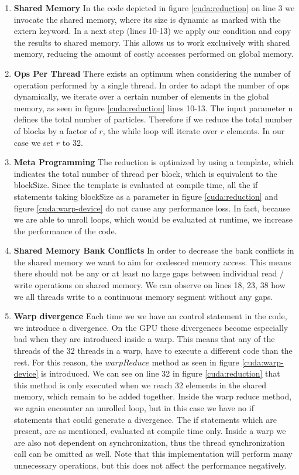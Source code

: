 \documentclass[]{article}
\begin{document}
\begin{enumerate}
	\item \textbf{Shared Memory} 
	In the code depicted in figure \ref{cuda:reduction} on line 3 we invocate the shared memory, where its size is dynamic as marked with the extern keyword. In a next step (lines 10-13) we apply our condition and copy the results to shared memory. This allows us to work exclusively with shared memory, reducing the amount of costly accesses performed on global memory.
	
	\item \textbf{Ops Per Thread} There exists an optimum when considering the number of operation performed by a single thread. In order to adapt the number of ops dynamically, we iterate over a certain number of elements in the global memory, as seen in figure \ref{cuda:reduction} lines 10-13. The input parameter n defines the total number of particles. Therefore if we reduce the total number of blocks by a factor of $r$, the while loop will iterate over $r$ elements. In our case we set $r$ to 32. 
	
	\item \textbf{Meta Programming} The reduction is optimized by using a template, which indicates the total number of thread per block, which is equivalent to the blockSize. Since the template is evaluated at compile time, all the if statements taking blockSize as a parameter in figure \ref{cuda:reduction} and figure \ref{cuda:warp-device} do not cause any performance loss. In fact, because we are able to unroll loops, which would be evaluated at runtime, we increase the performance of the code. 

	\item \textbf{Shared Memory Bank Conflicts} In order to decrease the bank conflicts in the shared memory we want to aim for coalesced memory access. This means there should not be any or at least no large gaps between individual read / write operations on shared memory. We can observe on lines 18, 23, 38 how we all threads write to a continuous memory segment without any gaps.
	
	\item \textbf{Warp divergence} Each time we we have an control statement in the code, we introduce a divergence. On the GPU these divergences become especially bad when they are introduced inside a warp. This means that any of the threads of the 32 threads in a warp, have to execute a different code than the rest. For this reason, the $warpReduce$ method as seen in figure \ref{cuda:warp-device} is introduced. We can see on line 32 in figure \ref{cuda:reduction} that this method is only executed when we reach 32 elements in the shared memory, which remain to be added together. Inside the warp reduce method, we again encounter an unrolled loop, but in this case we have no if statements that could generate a divergence. The if statements which are present, are as mentioned, evaluated at compile time only. Inside a warp we are also not dependent on synchronization, thus the thread synchronization call can be omitted as well. Note that this implementation will perform many unnecessary operations, but this does not affect the performance negatively.
\end{enumerate}
\end{document}
